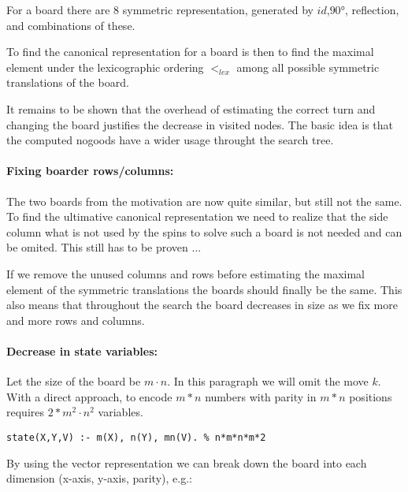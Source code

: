 \documentclass[]{llncs}
\newcommand{\spintable}[9]{ 
\node [matrix,ampersand replacement=\&,nodes={minimum size=4mm}]
{
    \node {#1}; \& \node{#2}; \& \node {#3}; \\ 
    \node {#4}; \& \node{#5}; \& \node {#6}; \\ 
    \node {#7}; \& \node{#8}; \& \node {#9}; \\ 
}; 
}
\begin{document}
For a board there are 8 symmetric representation, generated by $id$,$90°$,
reflection, and combinations of these. 

To find the canonical representation for a board is then to find the maximal element
under the lexicographic ordering $<_{lex}$ among all possible symmetric translations
of the board.

It remains to be shown that the overhead of estimating the correct turn and changing
the board justifies the decrease in visited nodes.  The basic idea is that the
computed nogoods have a wider usage throught the search tree.

\paragraph{Fixing boarder rows/columns: } The two boards from the motivation are now
quite similar, but still not the same. To find the ultimative canonical
representation we need to realize that the side column what is not used by the spins
to solve such a board is not needed and can be omited. This still has to be proven
...

If we remove the unused columns and rows before estimating the maximal element of the
symmetric translations the boards should finally be the same. This also means that
throughout the search the board decreases in size as we fix more and more rows and
columns. 


\paragraph{Decrease in state variables: } Let the size of the board be $m\cdot n$. In
this paragraph we will omit the move $k$. With a direct approach, to encode $m*n$
numbers with parity in $m*n$ positions requires $2*m^2\cdot n^2$ variables.
\begin{verbatim} 
state(X,Y,V) :- m(X), n(Y), mn(V). % n*m*n*m*2 
\end{verbatim} 
By using the vector representation we can break down the board into each dimension
(x-axis, y-axis, parity), e.g.: 

\end{document}
